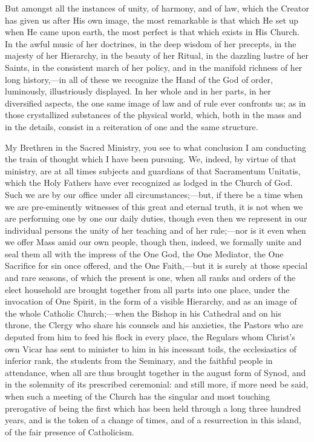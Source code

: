 But amongst all the instances of unity, of harmony,
and of law, which the Creator has given us after His own
image, the most remarkable is that which He set up when
He came upon earth, the most perfect is that which exists
in His Church. In the awful music of her doctrines, in
the deep wisdom of her precepts, in the majesty of her
Hierarchy, in the beauty of her Ritual, in the dazzling
lustre of her Saints, in the consistent march of her
policy, and in the manifold richness of her long
history,—in all of these we recognize the Hand of
the God of order, luminously, illustriously displayed. In
her whole and in her parts, in her diversified aspects,
the one same image of law and of rule ever confronts us;
as in those crystallized substances of the physical
world, which, both in the mass and in the details,
consist in a reiteration of one and the same structure.

My Brethren in the Sacred Ministry, you see to what
conclusion I am conducting the train of thought which I
have been pursuing. We, indeed, by virtue of that
ministry, are at all times subjects and guardians of that
Sacramentum Unitatis, which the Holy Fathers have ever
recognized as lodged in the Church of God. Such we are by
our office under all circumstances;—but, if there be
a time when we are pre-eminently witnesses of this great
and eternal truth, it is not when we are performing one
by one our daily duties, though even then we represent in
our individual persons the unity of her teaching and of
her rule;—nor is it even when we offer Mass amid our
own people, though then, indeed, we formally unite and
seal them all with the impress of the One God, the One
Mediator, the One Sacrifice for sin once offered, and the
One Faith,—but it is surely at those special and
rare seasons, of which the present is one, when all ranks
and orders of the elect household are brought together
from all parts into one place, under the invocation of
One Spirit, in the form of a visible Hierarchy, and as an
image of the whole Catholic Church;—when the Bishop
in his Cathedral and on his throne, the Clergy who share
his counsels and his anxieties, the Pastors who are
deputed from him to feed his flock in every place, the
Regulars whom Christ's own Vicar has sent to minister to
him in his incessant toils, the ecclesiastics of inferior
rank, the students from the Seminary, and the faithful
people in attendance, when all are thus brought together
in the august form of Synod, and in the solemnity of its
prescribed ceremonial: and still more, if more need be
said, when such a meeting of the Church has the singular
and most touching prerogative of being the first which
has been held through a long three hundred years, and is
the token of a change of times, and of a resurrection in
this island, of the fair presence of Catholicism.

